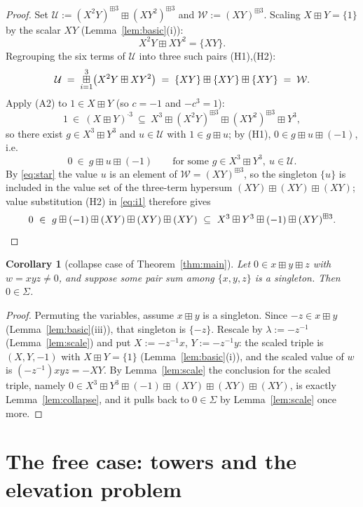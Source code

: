 \documentclass[11pt]{article}
\newtheorem{corollary}[theorem]{Corollary}
\theoremstyle{definition}
\theoremstyle{remark}
\newcommand{\bp}{\boxplus}
\newcommand{\bigboxplus}{\mathop{\mbox{\normalsize$\boxplus$}}\limits}
\begin{document}
\begin{proof}
Set $\mathcal U:=(X^2Y)^{\bp3}\bp(XY^2)^{\bp3}$ and
$\mathcal W:=(XY)^{\bp3}$. Scaling $X\bp Y=\{1\}$ by the scalar $XY$
(Lemma~\ref{lem:basic}(i)):
\[
  X^2Y\bp XY^2=\{XY\}.
\]
Regrouping the six terms of $\mathcal U$ into three such pairs (H1),(H2):
\begin{equation}\label{eq:star}
  \mathcal U
  \;=\;\bigboxplus_{i=1}^{3}\bigl(X^2Y\bp XY^2\bigr)
  \;=\;\{XY\}\bp\{XY\}\bp\{XY\}
  \;=\;\mathcal W .
\end{equation}
Apply (A2) to $1\in X\bp Y$ (so $c=-1$ and $-c^3=1$):
\[
  1\ \in\ (X\bp Y)^{\cdot3}\ \subseteq\
   X^3\bp(X^2Y)^{\bp3}\bp(XY^2)^{\bp3}\bp Y^3 ,
\]
so there exist $g\in X^3\bp Y^3$ and $u\in\mathcal U$ with $1\in g\bp u$;
by (H1), $0\in g\bp u\bp(-1)$, i.e.\
\begin{equation}\label{eq:i1}
  0\ \in\ g\bp u\bp(-1)\qquad
   \text{for some } g\in X^3\bp Y^3,\ u\in\mathcal U .
\end{equation}
By \eqref{eq:star} the value $u$ is an element of
$\mathcal W=(XY)^{\bp3}$, so the singleton $\{u\}$ is included in the
value set of the three-term hypersum $(XY)\bp(XY)\bp(XY)$; value
substitution (H2) in \eqref{eq:i1} therefore gives
\[
  0\ \in\ g\bp(-1)\bp(XY)\bp(XY)\bp(XY)
  \ \subseteq\ X^3\bp Y^3\bp(-1)\bp(XY)^{\bp3} . \qedhere
\]
\end{proof}

\begin{corollary}[collapse case of Theorem~\ref{thm:main}]\label{cor:collapse}
Let $0\in x\bp y\bp z$ with $w=xyz\neq0$, and suppose some pair sum among
$\{x,y,z\}$ is a singleton. Then $0\in\Sigma$.
\end{corollary}
\begin{proof}
Permuting the variables, assume $x\bp y$ is a singleton. Since
$-z\in x\bp y$ (Lemma~\ref{lem:basic}(iii)), that singleton is $\{-z\}$.
Rescale by $\lambda:=-z^{-1}$ (Lemma~\ref{lem:scale}) and put
$X:=-z^{-1}x$, $Y:=-z^{-1}y$: the scaled triple is $(X,Y,-1)$ with
$X\bp Y=\{1\}$ (Lemma~\ref{lem:basic}(i)), and the scaled value of $w$ is
$(-z^{-1})xyz=-XY$. By Lemma~\ref{lem:scale} the conclusion for the
scaled triple, namely
$0\in X^3\bp Y^3\bp(-1)\bp(XY)\bp(XY)\bp(XY)$, is exactly
Lemma~\ref{lem:collapse}, and it pulls back to $0\in\Sigma$ by
Lemma~\ref{lem:scale} once more.
\end{proof}

\section{The free case: towers and the elevation problem}\label{sec:free}
\end{document}
